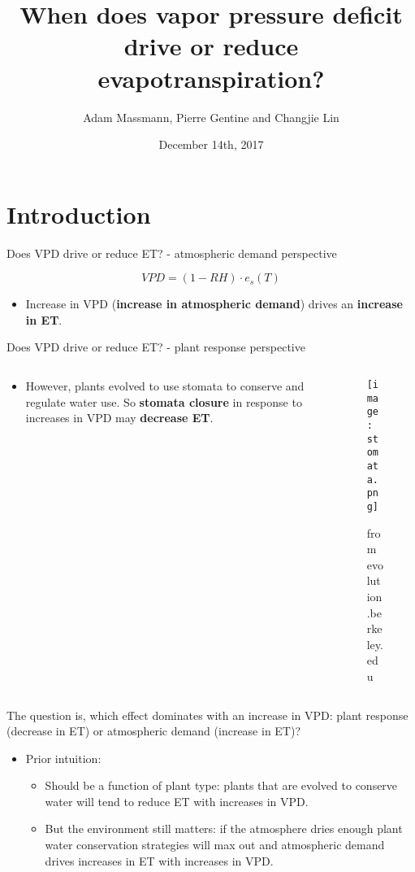 \documentclass[aspectratio=169]{beamer}
\title[Your Short Title]{When does vapor pressure deficit drive or reduce evapotranspiration?}
\author{Adam Massmann,  Pierre Gentine and Changjie Lin}
\institute{AGU Fall Meeting}
\date{December 14th, 2017}
\begin{document}
\begin{frame}
  \titlepage
\end{frame}


\section{Introduction}
\begin{frame}{Does VPD drive or reduce ET? - atmospheric demand perspective}
  \begin{Huge}
  \[VPD = (1-RH)\cdot e_s (T)\]
\end{Huge}
  \begin{itemize}
  \item Increase in VPD (\textbf{increase in atmospheric demand}) drives  an \textbf{increase in ET}.
  \end{itemize}
\end{frame}

\begin{frame}{Does VPD drive or reduce ET? - plant response perspective}
  \begin{columns}
    \begin{column}{0.5\textwidth}
      \begin{itemize}
      \item However, plants evolved to use stomata to conserve and regulate water use. So \textbf{stomata closure} in response to increases in VPD may \textbf{decrease ET}.
      \end{itemize}
    \end{column}
    \begin{column}{0.5\textwidth}
      \begin{figure}
        \texttt{[image: stomata.png]}%
        \caption{from evolution.berkeley.edu}
      \end{figure}
    \end{column}
  \end{columns}
\end{frame}


\begin{frame}{The question is, which effect dominates with an increase in VPD: plant response (decrease in ET) or atmospheric demand (increase in ET)?}
  \begin{itemize}
  \item Prior intuition:
    \begin{itemize}
    \item Should be a function of plant type: plants that are evolved to conserve water will tend to reduce ET with increases in VPD.
    \item But the environment still matters: if the atmosphere dries enough plant water conservation strategies will max out and atmospheric demand drives increases in ET with increases in VPD.
    \end{itemize}
  \end{itemize}
\end{frame}
\end{document}
